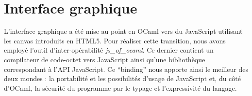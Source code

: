 \documentclass[a4paper, 11pt]{report}
\begin{document}
\chapter{Interface graphique}

L'interface graphique a été mise au point en OCaml vers du JavaScript
utilisant les canvas introduits en HTML5. Pour réaliser cette
transition, nous avons employé l'outil d'inter-opérabilité
\emph{js_of_ocaml}. Ce dernier contient un compilateur de code-octet
vers JavaScript ainsi qu'une bibliothèque correspondant à l'API
JavaScript. Ce ``binding'' nous apporte ainsi le meilleur des deux
mondes : la portabilité et les possibilités d'usage de JavaScript et, du
côté d'OCaml, la sécurité du programme par le typage et l'expressivité du       
langage.
\end{document}
